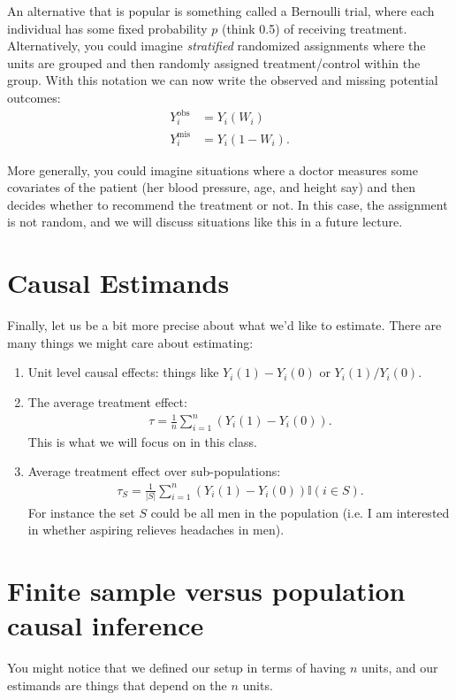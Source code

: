 \documentclass[twoside,12pt]{article}
\begin{document}
An alternative that is popular is something called a Bernoulli trial, where each individual has some fixed probability $p$ (think 0.5) of receiving treatment.
Alternatively, you could imagine \emph{stratified} randomized assignments where the units are grouped and then randomly assigned treatment/control within the group. With this notation we can now write the observed and missing potential outcomes:
\begin{align*}
Y_i^{\text{obs}} &= Y_i(W_i) \\
Y_i^{\text{mis}} &= Y_i(1 - W_i).
\end{align*}

More generally, you could imagine situations where a doctor measures some covariates of the patient (her blood pressure, age, and height say) and then decides whether to recommend the treatment or not. In this case, the assignment is not random, and we will discuss situations like this in a future lecture.

\section{Causal Estimands} 
Finally, let us be a bit more precise about what we'd like to estimate. 
There are many things we might care about estimating:
\begin{enumerate}
\item Unit level causal effects: things like $Y_i(1) - Y_i(0)$ or $Y_i(1)/Y_i(0)$.
\item The average treatment effect:
\begin{align*}
\tau = \frac{1}{n} \sum_{i=1}^n (Y_i(1) - Y_i(0)).
\end{align*}
This is what we will focus on in this class.
\item Average treatment effect over sub-populations:
\begin{align*}
\tau_S = \frac{1}{|S|} \sum_{i=1}^n (Y_i(1) - Y_i(0)) \mathbb{I}(i \in S).
\end{align*}
For instance the set $S$ could be all men in the population (i.e. I am interested in whether aspiring relieves headaches in men).
\end{enumerate}

\section{Finite sample versus population causal inference}
You might notice that we defined our setup in terms of having $n$ units, and our estimands are things that depend on the $n$ units.
\end{document}
